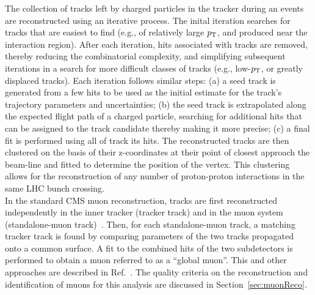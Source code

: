 

\indent The collection of tracks left by charged particles in the tracker during an events are 
reconstructed using an iterative process. The inital iteration searches for tracks 
that are easiest to find (e.g., of relatively large $p_{\mathrm{T}}$, and produced near the 
interaction region). After each iteration, hits associated with tracks are removed, 
thereby reducing the combinatorial complexity, and simplifying subsequent iterations 
in a search for more difficult classes of tracks (e.g., low-$p_{\mathrm{T}}$, or greatly displaced
tracks)\cite{Chatrchyan:2014fea}. Each iteration follows similar steps: (a) a seed 
track is generated from a few hits to be used as the initial estimate for the track's 
trajectory parameters and uncertainties; (b) the seed track is extrapolated along the 
expected flight path of a charged particle, searching for additional hits that can be 
assigned to the track candidate thereby making it more precise; (c) a final fit is performed 
using all of track its hits. The reconstructed tracks are then clustered on the basis of 
their z-coordinates at their point of closest approach the beam-line and fitted to determine 
the position of the vertex. This clustering allows for the reconstruction of any number 
of proton-proton interactions in the same LHC bunch crossing.\\

\indent In the standard CMS muon reconstruction, tracks are first reconstructed independently 
in the inner tracker (tracker track) and in the muon system (standalone-muon track)~\cite{1748-0221-7-10-P10002}. 
Then, for each standalone-muon track, a matching tracker track is found by comparing 
parameters of the two tracks propagated onto a common surface. A fit to the combined hits 
of the two subdetectors is performed to obtain a muon referred to as a ``global muon''.
This and other approaches are described in Ref.~\cite{PAS-MUO-10-002}. The quality criteria on the
reconstruction and identification of muons for this analysis are discussed in Section~\ref{sec:muonReco}. \\

